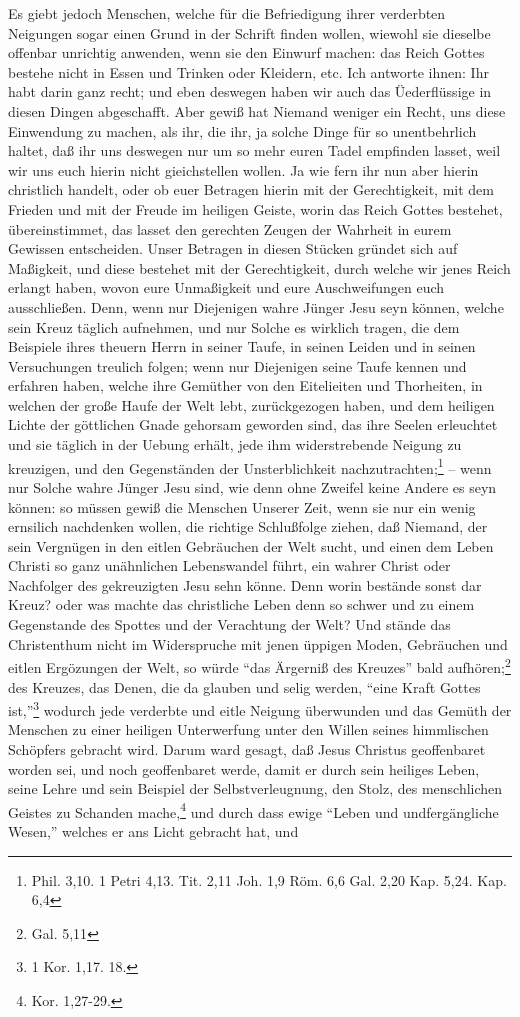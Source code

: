 Es giebt jedoch Menschen, welche für die Befriedigung ihrer verderbten Neigungen sogar einen Grund in der Schrift finden wollen, wiewohl sie dieselbe offenbar unrichtig anwenden, wenn sie den Einwurf machen: das Reich Gottes bestehe nicht in Essen und Trinken oder Kleidern, etc. Ich antworte ihnen: Ihr habt darin ganz recht; und eben deswegen haben wir auch das Üederflüssige in diesen Dingen abgeschafft. Aber gewiß hat Niemand weniger ein Recht, uns diese Einwendung zu machen, als ihr, die ihr, ja solche Dinge für so unentbehrlich haltet, daß ihr uns deswegen nur um so mehr euren Tadel empfinden lasset, weil wir uns euch hierin nicht gieichstellen wollen. Ja wie fern ihr nun aber hierin christlich handelt, oder ob euer Betragen hierin mit der Gerechtigkeit, mit dem Frieden und mit der Freude im heiligen Geiste, worin das Reich Gottes bestehet, übereinstimmet, das lasset den gerechten Zeugen der Wahrheit in eurem Gewissen entscheiden. Unser Betragen in diesen Stücken gründet sich auf Maßigkeit, und diese bestehet mit der Gerechtigkeit, durch welche wir jenes Reich erlangt haben, wovon eure Unmaßigkeit und eure Auschweifungen euch ausschließen. Denn, wenn nur Diejenigen wahre Jünger Jesu seyn können, welche sein Kreuz täglich aufnehmen, und nur Solche es wirklich tragen, die dem Beispiele ihres theuern Herrn in seiner Taufe, in seinen Leiden und in seinen Versuchungen treulich folgen; wenn nur Diejenigen seine Taufe kennen und erfahren haben, welche ihre Gemüther von den Eitelieiten und Thorheiten, in welchen der große Haufe der Welt lebt, zurückgezogen haben, und dem heiligen Lichte der göttlichen Gnade gehorsam geworden sind, das ihre Seelen erleuchtet und sie täglich in der Uebung erhält, jede ihm widerstrebende Neigung zu kreuzigen, und den Gegenständen der Unsterblichkeit nachzutrachten;\footnote{Phil. 3,10. 1 Petri 4,13. Tit. 2,11 Joh. 1,9 Röm. 6,6 Gal. 2,20 Kap. 5,24. Kap. 6,4} -- wenn nur Solche wahre Jünger Jesu sind, wie denn ohne Zweifel keine Andere es seyn können: so müssen gewiß die Menschen Unserer Zeit, wenn sie nur ein wenig ernsilich nachdenken wollen, die richtige Schlußfolge ziehen, daß Niemand, der sein Vergnügen in den eitlen Gebräuchen der Welt sucht, und einen dem Leben Christi so ganz unähnlichen  Lebenswandel führt, ein wahrer Christ oder Nachfolger des gekreuzigten Jesu sehn könne. Denn worin bestände sonst dar Kreuz? oder was machte das christliche Leben denn so schwer und zu einem Gegenstande des Spottes und der Verachtung der Welt? Und stände das Christenthum nicht im Widerspruche mit jenen üppigen Moden, Gebräuchen und eitlen Ergözungen der Welt, so würde "`das Ärgerniß des Kreuzes"' bald aufhören;\footnote{Gal. 5,11} des Kreuzes, das Denen, die da glauben und selig werden, "`eine Kraft Gottes ist,"'\footnote{1 Kor. 1,17. 18.} wodurch jede verderbte und eitle Neigung überwunden und das Gemüth der Menschen zu einer heiligen Unterwerfung unter den Willen seines himmlischen Schöpfers gebracht wird. Darum ward gesagt, daß Jesus Christus geoffenbaret worden sei, und noch geoffenbaret werde, damit er durch sein heiliges Leben, seine Lehre und sein Beispiel der Selbstverleugnung, den Stolz, des menschlichen Geistes zu Schanden mache,\footnote{Kor. 1,27-29.} und durch dass ewige "`Leben und undfergängliche Wesen,"' welches er ans Licht gebracht hat, und 